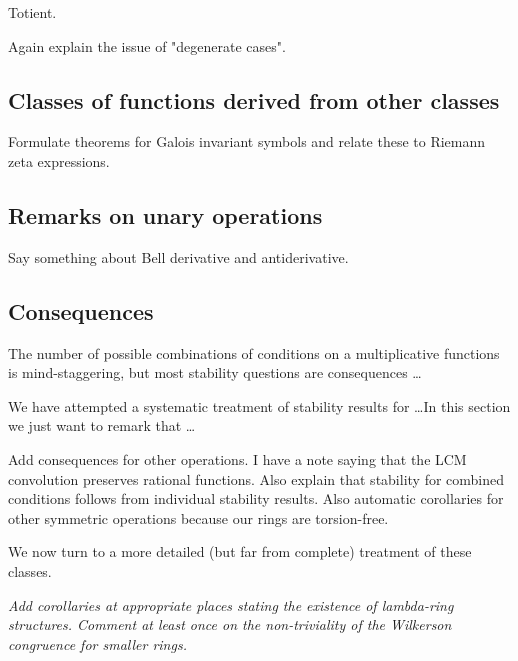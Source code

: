 \documentclass[a4paper]{article}
\begin{document}
\begin{definition}
Totient.
\end{definition}

\begin{remark}
Again explain the issue of "degenerate cases".
\end{remark}


\subsection{Classes of functions derived from other classes}

Formulate theorems for Galois invariant symbols and relate these to Riemann zeta expressions.



\subsection{Remarks on unary operations}

Say something about Bell derivative and antiderivative.



\subsection{Consequences}

The number of possible combinations of conditions on a multiplicative functions is mind-staggering, but most stability questions are consequences \ldots

We have attempted a systematic treatment of stability results for \ldots In this section we just want to remark that \ldots

\begin{remark}
Add consequences for other operations. I have a note saying that the LCM convolution preserves rational functions. Also explain that stability for combined conditions follows from individual stability results. Also automatic corollaries for other symmetric operations because our rings are torsion-free.
\end{remark}

We now turn to a more detailed (but far from complete) treatment of these classes. 

\emph{Add corollaries at appropriate places stating the existence of lambda-ring structures. Comment at least once on the non-triviality of the Wilkerson congruence for smaller rings.}
\end{document}
